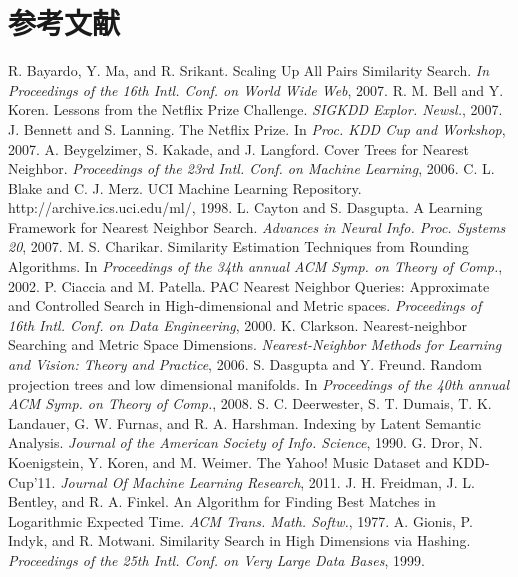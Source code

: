 \documentclass[twocolumn]{article}
\begin{document}
\section{参考文献}
\renewcommand{\section}[2]{}
\begin{thebibliography}{1}
 R. Bayardo, Y. Ma, and R. Srikant. Scaling Up All Pairs Similarity Search. \emph{In Proceedings of the 16th Intl. Conf. on World Wide Web}, 2007.
 R. M. Bell and Y. Koren. Lessons from the Netflix Prize Challenge. \emph{SIGKDD Explor. Newsl.}, 2007.
 J. Bennett and S. Lanning. The Netflix Prize. In \emph{Proc. KDD Cup and Workshop}, 2007.
 A. Beygelzimer, S. Kakade, and J. Langford. Cover Trees for Nearest Neighbor. \emph{Proceedings of the 23rd Intl. Conf. on Machine Learning}, 2006.
 C. L. Blake and C. J. Merz. UCI Machine Learning Repository. http://archive.ics.uci.edu/ml/, 1998.
 L. Cayton and S. Dasgupta. A Learning Framework for Nearest Neighbor Search. \emph{Advances in Neural Info. Proc. Systems 20}, 2007.
 M. S. Charikar. Similarity Estimation Techniques from Rounding Algorithms. In \emph{Proceedings of the 34th
annual ACM Symp. on Theory of Comp.}, 2002.
 P. Ciaccia and M. Patella. PAC Nearest Neighbor Queries: Approximate and Controlled Search in High-dimensional and Metric spaces. \emph{Proceedings of 16th Intl. Conf. on Data Engineering}, 2000.
 K. Clarkson. Nearest-neighbor Searching and Metric Space Dimensions. \emph{Nearest-Neighbor Methods for
Learning and Vision: Theory and Practice}, 2006.
 S. Dasgupta and Y. Freund. Random projection trees and low dimensional manifolds. In \emph{Proceedings of the
40th annual ACM Symp. on Theory of Comp.}, 2008.
 S. C. Deerwester, S. T. Dumais, T. K. Landauer, G. W. Furnas, and R. A. Harshman. Indexing by Latent Semantic Analysis. \emph{Journal of the American Society of Info. Science}, 1990.
 G. Dror, N. Koenigstein, Y. Koren, and M. Weimer. The Yahoo! Music Dataset and KDD-Cup’11. \emph{Journal Of Machine Learning Research}, 2011.
 J. H. Freidman, J. L. Bentley, and R. A. Finkel. An Algorithm for Finding Best Matches in Logarithmic Expected Time. \emph{ACM Trans. Math. Softw.}, 1977.
 A. Gionis, P. Indyk, and R. Motwani. Similarity Search in High Dimensions via Hashing. \emph{Proceedings of the 25th Intl. Conf. on Very Large Data Bases}, 1999.

\end{thebibliography}
\end{document}
